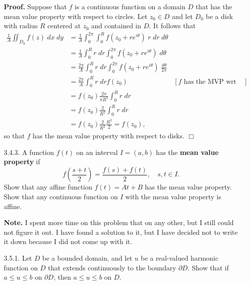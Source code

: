 \documentclass[9pt]{article}
\newcommand{\qed}{\hfill \ensuremath{\Box}}
\begin{document}
\begin{enumerate}
      \textbf{Proof.} Suppose that $f$ is a continuous function on a domain $D$
      that has the mean value property with respect to circles. Let $z_0 \in D$
      and let $D_0$ be a disk with radius $R$ centered at $z_0$ and contained in
      $D$. It follows that
      \begin{align*}
         \frac{1}{A} \iint_{D_0} f(z)\;dx\;dy &= 
         \frac{1}{A} \int_0^{2\pi}\int_0^R f(z_0 +
            re^{i\theta})\;r\;dr\;d\theta \\ 
         &= \frac{1}{A} \int_0^Rr\;dr\int_0^{2\pi} f(z_0 +
            re^{i\theta})\;d\theta \\ 
         &= \frac{2\pi}{A} \int_0^Rr\;dr\int_0^{2\pi} f(z_0 +
            re^{i\theta})\;\frac{d\theta}{2\pi}\\ 
         &= \frac{2\pi}{A} \int_0^Rr\;dr f(z_0) &[f \text{ has the MVP wrt circles}]\\ 
         &= f(z_0)\frac{2\pi}{\pi R^2} \int_0^Rr\;dr\\ 
         &= f(z_0)\frac{2}{R^2} \int_0^Rr\;dr\\ 
         &= f(z_0)\frac{2}{R^2} \frac{R^2}{2} = f(z_0),
      \end{align*}
      so that $f$ has the mean value property with respect to disks. \qed
   \item[3.4.3.]  A function $f(t)$ on an interval $I = (a, b)$ has the
                  \textbf{mean value property} if
                  $$f\left(\frac{s+t}{2}\right) = \frac{f(s) + f(t)}{2},
                    \quad s, t \in I.$$
                  Show that any affine function $f(t) = At + B$ has the mean
                  value property. Show that any continuous function on $I$ with
                  the mean value property is affine.
                  
      \textbf{Note.} I spent more time on this problem that on any other, but
      I still could not figure it out. I have found a solution to it, but I have
      decided not to write it down because I did not come up with it.
   \item[3.5.1.]  Let $D$ be a bounded domain, and let $u$ be a real-valued
                  harmonic function on $D$ that extends continuously to the
                  boundary $\partial D$. Show that if $a \le u \le b$ on
                  $\partial D$, then $a \le u \le b$ on $D$.
                  

\end{enumerate}
\end{document}
